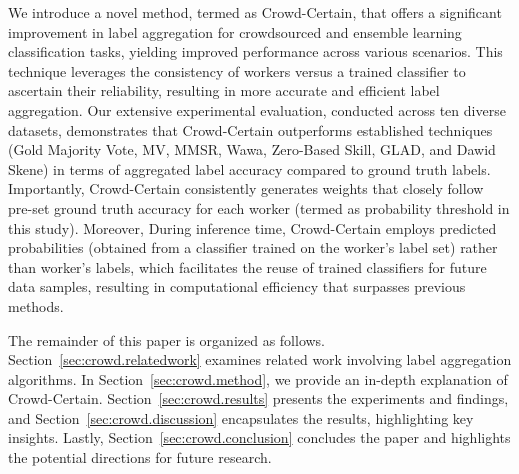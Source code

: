 We introduce a novel method, termed as Crowd-Certain, that offers a significant improvement  in label aggregation for crowdsourced and ensemble learning classification tasks, yielding improved performance across various scenarios. This technique leverages the consistency of workers versus a trained classifier to ascertain their reliability, resulting in more accurate and efficient label aggregation.
Our extensive experimental evaluation, conducted across ten diverse datasets, demonstrates that Crowd-Certain outperforms established techniques (Gold Majority Vote, MV, MMSR, Wawa, Zero-Based Skill, GLAD, and Dawid Skene) in terms of aggregated label accuracy compared to ground truth labels. Importantly, Crowd-Certain consistently generates weights that closely follow pre-set ground truth accuracy for each worker (termed as probability threshold in this study). Moreover, During inference time, Crowd-Certain employs predicted probabilities (obtained from a classifier trained on the worker's label set) rather than worker's labels, which facilitates the reuse of trained classifiers for future data samples, resulting in computational efficiency that surpasses previous methods.

The remainder of this paper is organized as follows. Section~\ref{sec:crowd.relatedwork} examines related work involving label aggregation algorithms. In Section~\ref{sec:crowd.method}, we provide an in-depth explanation of Crowd-Certain. Section~\ref{sec:crowd.results} presents the experiments and findings, and Section~\ref{sec:crowd.discussion} encapsulates the results, highlighting key insights. Lastly, Section~\ref{sec:crowd.conclusion} concludes the paper and highlights the potential directions for future research.

